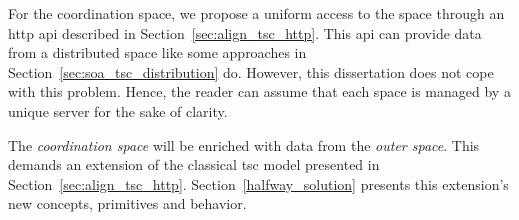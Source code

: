 

For the coordination space, we propose a uniform access to the space through an \acs{http} \ac{api} described in Section~\ref{sec:align_tsc_http}.
This \ac{api} can provide data from a distributed space like some approaches in Section~\ref{sec:soa_tsc_distribution} do.
However, this dissertation does not cope with this problem. %
Hence, the reader can assume that each space is managed by a unique server for the sake of clarity.


The \emph{coordination space} will be enriched with data from the \emph{outer space}. %
This demands an extension of the classical \ac{tsc} model presented in Section~\ref{sec:align_tsc_http}.
Section~\ref{halfway_solution} presents this extension's new concepts, primitives and behavior.